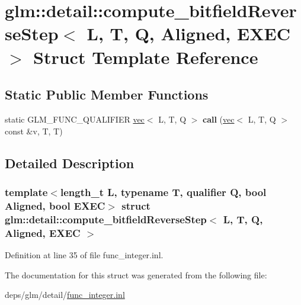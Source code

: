 \hypertarget{structglm_1_1detail_1_1compute__bitfieldReverseStep}{}\section{glm\+:\+:detail\+:\+:compute\+\_\+bitfield\+Reverse\+Step$<$ L, T, Q, Aligned, E\+X\+EC $>$ Struct Template Reference}
\label{structglm_1_1detail_1_1compute__bitfieldReverseStep}
\subsection*{Static Public Member Functions}
\begin{DoxyCompactItemize}
\item 
\mbox{\label{structglm_1_1detail_1_1compute__bitfieldReverseStep_aa09f49bf6a1f36a957a628cc01812882}} 
static G\+L\+M\+\_\+\+F\+U\+N\+C\+\_\+\+Q\+U\+A\+L\+I\+F\+I\+ER \hyperlink{structglm_1_1vec}{vec}$<$ L, T, Q $>$ {\bfseries call} (\hyperlink{structglm_1_1vec}{vec}$<$ L, T, Q $>$ const \&v, T, T)
\end{DoxyCompactItemize}


\subsection{Detailed Description}
\subsubsection*{template$<$length\+\_\+t L, typename T, qualifier Q, bool Aligned, bool E\+X\+EC$>$\newline
struct glm\+::detail\+::compute\+\_\+bitfield\+Reverse\+Step$<$ L, T, Q, Aligned, E\+X\+E\+C $>$}



Definition at line 35 of file func\+\_\+integer.\+inl.



The documentation for this struct was generated from the following file\+:\begin{DoxyCompactItemize}
\item 
deps/glm/detail/\hyperlink{func__integer_8inl}{func\+\_\+integer.\+inl}\end{DoxyCompactItemize}
